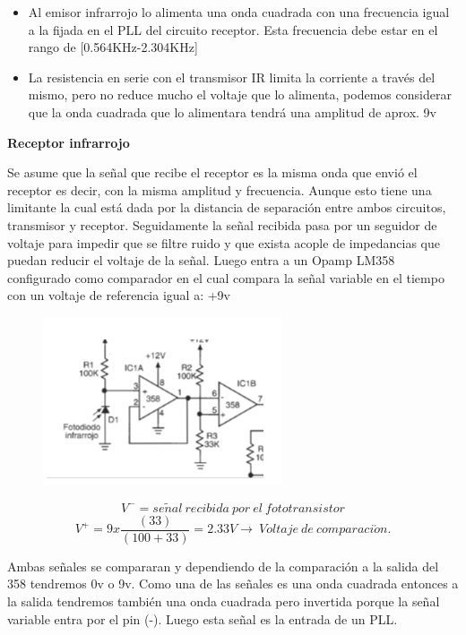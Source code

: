 \documentclass[a4paper,11pt]{article}
\begin{document}
\begin{itemize}
\item Al emisor infrarrojo lo alimenta una onda cuadrada con una frecuencia igual a la fijada en el PLL del circuito receptor. Esta frecuencia debe estar en el rango de [0.564KHz-2.304KHz]
\item La resistencia en serie con el transmisor IR limita la corriente a través del mismo, pero no reduce mucho el voltaje que lo alimenta, podemos considerar que la onda cuadrada que lo alimentara tendrá una amplitud de aprox. 9v
\end{itemize}

\newpage
\textbf{Receptor infrarrojo}

Se asume que la señal que recibe el receptor es la misma onda que envió el receptor es decir, con la misma amplitud y frecuencia. Aunque esto tiene una limitante la cual está dada por la distancia de separación entre ambos circuitos, transmisor y receptor.
Seguidamente la señal recibida pasa por un seguidor de voltaje para impedir que se filtre ruido y que exista acople de impedancias que puedan reducir el voltaje de la señal. Luego entra a un Opamp LM358 configurado como comparador en el cual compara la señal variable en el tiempo con un voltaje de referencia igual a: +9v

\begin{figure}[h]
	\centering
	\includegraphics[width=0.7\linewidth]{./22a}
\end{figure}

$$V^- = se\tilde{n}al \ recibida \ por \ el \ fototransistor$$
$$V^+ = 9x \frac{(33)}{(100+33)} = 2.33 V \rightarrow \ Voltaje \ de \ comparaci\acute{o}n.$$

Ambas señales se compararan y dependiendo de la comparación a la salida del 358 tendremos 0v o 9v. Como una de las señales es una onda cuadrada entonces a la salida tendremos también una onda cuadrada pero invertida porque la señal variable entra por el pin (-). Luego esta señal es la entrada de un PLL.
\end{document}
